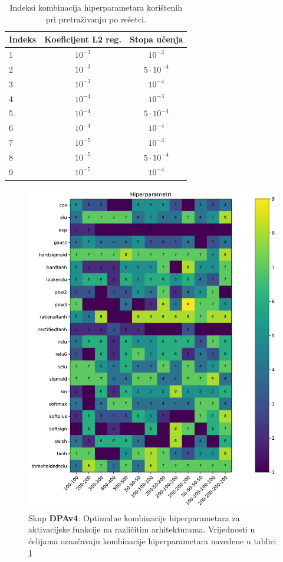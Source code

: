 \documentclass[times, utf8, numeric, diplomski]{fer}
\begin{document}
\begin{table}[H]
\centering
\begin{tabular}{lcc}
Indeks & Koeficijent L2 reg. & Stopa učenja \\
\hline
1 & $10^{-3}$ & $10^{-3}$  \\
2 & $10^{-3}$ & $5 \cdot 10^{-4}$ \\
3 & $10^{-3}$ & $10^{-4}$ \\
4 & $10^{-4}$ & $10^{-3}$ \\
5 & $10^{-4}$ & $5 \cdot 10^{-4}$ \\
6 & $10^{-4}$ & $10^{-4}$ \\
7 & $10^{-5}$ & $10^{-3}$ \\
8 & $10^{-5}$ & $5 \cdot 10^{-4}$ \\
9 & $10^{-5}$ & $10^{-4}$
\end{tabular}
\caption{Indeksi kombinacija hiperparametara korištenih pri pretraživanju po rešetci.}
\label{tab:hp_comb}
\end{table}

\begin{figure}[H]
\includegraphics[width=\textwidth]{greedy_9_hp.pdf}
\centering
\caption{Skup \textbf{DPAv4}: Optimalne kombinacije hiperparametara za aktivacijske funkcije na različitim arhitekturama. Vrijednosti u ćelijama označavaju kombinacije hiperparametara navedene u tablici \ref{tab:hp_comb}}
\label{fig:greedy_9_hp}
\end{figure}
\end{document}
